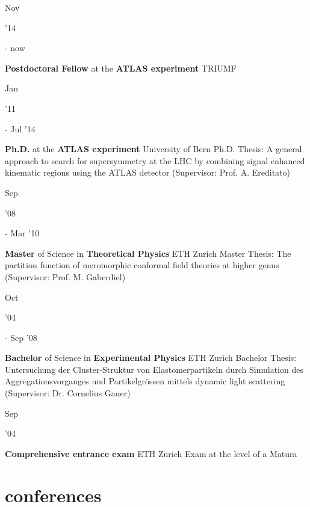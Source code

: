 \documentclass[]{cv} %
\begin{document}
\begin{entrylist}
  \entry
  {\parbox[t]{\parboxWidthOne}{Nov}\parbox[t]{\parboxWidthTwo}{\hfill '14} - now}
  {\textbf{Postdoctoral Fellow} at the \textbf{ATLAS experiment}}
  {TRIUMF}
  {}
  \entry
  {\parbox[t]{\parboxWidthOne}{Jan}\parbox[t]{\parboxWidthTwo}{\hfill '11} - Jul '14}
  {\textbf{Ph.D.} at the \textbf{ATLAS experiment}}
  {University of Bern}
  {Ph.D. Thesis: A general approach to search for supersymmetry at the LHC by combining signal enhanced kinematic regions using the ATLAS detector (Supervisor:
  Prof. A. Ereditato)}
  \entry
  {\parbox[t]{\parboxWidthOne}{Sep}\parbox[t]{\parboxWidthTwo}{\hfill '08} - Mar '10}
  {\textbf{Master} of Science in \textbf{Theoretical Physics}}
  {ETH Zurich}
  {Master Thesis: The partition function of meromorphic conformal field theories at higher genus (Supervisor: Prof. M. Gaberdiel)}
  \entry
  {\parbox[t]{\parboxWidthOne}{Oct}\parbox[t]{\parboxWidthTwo}{\hfill '04} - Sep '08}
  {\textbf{Bachelor} of Science in \textbf{Experimental Physics}}
  {ETH Zurich}
  {Bachelor Thesis: Untersuchung der Cluster-Struktur von Elastomerpartikeln durch Simulation des Aggregationsvorganges und Partikelgr{\"o}ssen mittels dynamic
light scattering (Supervisor: Dr. Cornelius Gauer)}
\entry
{\parbox[t]{\parboxWidthOne}{Sep}\parbox[t]{\parboxWidthTwo}{\hfill '04}}
{\textbf{Comprehensive entrance exam}}
{ETH Zurich}
{Exam at the level of a Matura}
\end{entrylist}

\section{conferences}
\end{document}
